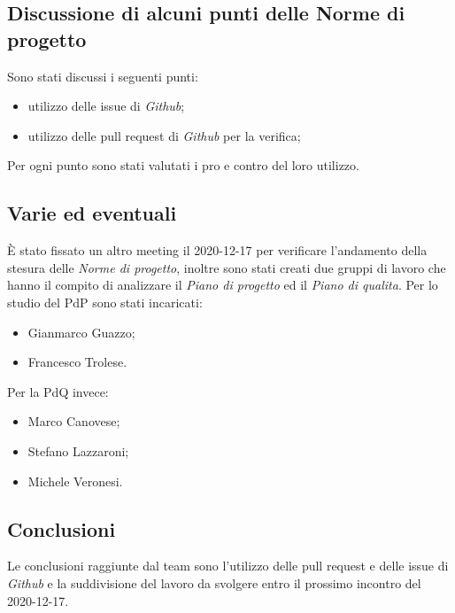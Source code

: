 	\subsection{Discussione di alcuni punti delle Norme di progetto}
	Sono stati discussi i seguenti punti:
	\begin{itemize}
		\item utilizzo delle issue di \textit{Github};
		\item utilizzo delle pull request di \textit{Github} per la verifica;
	\end{itemize}
	Per ogni punto sono stati valutati i pro e contro del loro utilizzo.
	
	\subsection{Varie ed eventuali}
	È stato fissato un altro meeting il 2020-12-17 per verificare l'andamento della stesura delle \textit{Norme di progetto}, inoltre sono stati creati due gruppi di lavoro che hanno il compito di analizzare il \textit{Piano di progetto} ed il \textit{Piano di qualita}.
	Per lo studio del PdP sono stati incaricati:
	\begin{itemize}
		\item Gianmarco Guazzo;
		\item Francesco Trolese.
	\end{itemize}
	Per la PdQ invece:
	\begin{itemize}
		\item Marco Canovese;
		\item Stefano Lazzaroni;
		\item Michele Veronesi.
	\end{itemize}
	

	\subsection{Conclusioni}
	Le conclusioni raggiunte dal team sono l'utilizzo delle pull request e delle issue di \textit{Github} e la suddivisione del lavoro da svolgere entro il prossimo incontro del 2020-12-17.

	